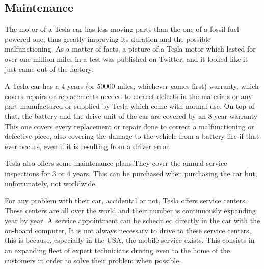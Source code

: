 \subsection{Maintenance}

The motor of a Tesla car has less moving parts than the one of a fossil fuel powered one, thus greatly improving its duration and the possible malfunctioning. As a matter of facts, a picture of a Tesla motor which lasted for over one million miles in a test was published on Twitter, and it looked like it just came out of the factory\cite{tesla1mMiles}.

A Tesla car has a 4 years (or 50000 miles, whichever comes first) warranty, which covers repairs or replacements needed to correct defects in the materials or any part manufactured or supplied by Tesla which come with normal use. On top of that, the battery and the drive unit of the car are covered by an 8-year warranty This one covers every replacement or repair done to correct a malfunctioning or defective piece, also covering the damage to the vehicle from a battery fire if that ever occurs, even if it is resulting from a driver error\cite{teslaWarranty}. 

Tesla also offers some maintenance plans.They cover the annual service inspections for 3 or 4 years. This can be purchased when purchasing the car but, unfortunately, not worldwide. 

For any problem with their car, accidental or not, Tesla offers service centers. These centers are all over the world and their number is continuously expanding year by year. A service appointment can be scheduled directly in the car with the on-board computer, It is not always necessary to drive to these service centers, this is because, especially in the USA, the mobile service exists. This consists in an expanding fleet of expert technicians driving even to the home of the customers in order to solve their problem when possible.



